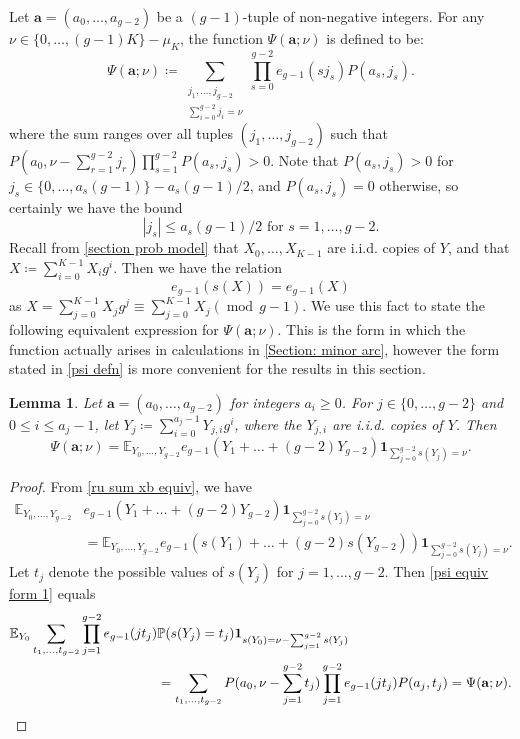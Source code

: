 \documentclass[hidelinks,11pt,reqno]{amsart}
\renewcommand{\leq}{\leqslant}
\renewcommand{\geq}{\geqslant}
\newcommand{\E}{\ensuremath{\mathbb{E}}}
\newcommand{\prob}{\ensuremath{\mathbb{P}}}
\newcommand{\ind}{\mathbf{1}}
\newcommand{\xb}{X}
\newcommand{\ru}[1]{e_{g-1}(#1)}
\newcommand{\sx}[1]{s(#1)}
\newtheorem{lemma}[prop]{Lemma}
\theoremstyle{remark}
\newcommand{\md}[1]{\ensuremath{(\operatorname{mod}\, #1)}}
\begin{document}
Let $\mathbf{a}=(a_{0},\ldots, a_{g-2})$ be a $(g-1)$-tuple of non-negative integers. For any $\nu\in \{0,\ldots, (g-1)K\}-\mu_{K}$, the function $\Psi(\mathbf{a};\nu)$ is defined to be:
\begin{equation}\label{psi defn}
    \Psi(\mathbf{a};\nu)\coloneq \sum_{\substack{j_{1},\ldots, j_{g-2}\\ \sum_{i=0}^{g-2} j_{i}=\nu}}\prod_{s=0}^{g-2}\ru{sj_{s}}P(a_{s},j_{s}).
\end{equation}
where the sum ranges over all tuples $(j_{1},\ldots, j_{g-2})$ such that $P(a_{0},\nu-\sum_{r=1}^{g-2}j_{r})\prod_{s=1}^{g-2}P(a_{s},j_{s})>0$. Note that $P(a_{s},j_{s})>0$ for $j_{s}\in \{0,\ldots, a_{s}(g-1)\}-a_{s}(g-1)/2$, and $P(a_{s},j_{s})=0$ otherwise, so certainly we have the bound
\begin{equation}\label{j range remark}
|j_{s}|\leq a_{s}(g-1)/2 \textrm{ for }s=1,\ldots, g-2.
\end{equation}
Recall from \cref{section prob model} that $X_{0},\ldots, X_{K-1}$ are i.i.d. copies of $Y$, and that $\xb\coloneq \sum_{i=0}^{K-1}X_{i}g^{i}$. Then we have the relation
\begin{equation}\label{ru sum xb equiv}\ru{\sx{\xb}}=\ru{\xb}\end{equation}
 as $\xb=\sum_{j=0}^{K-1}X_{j}g^{j}\equiv \sum_{j=0}^{K-1}X_{j}\md{g-1}$. We use this fact to state the following equivalent expression for $\Psi(\mathbf{a};\nu)$. This is the form in which the function actually arises in calculations in \cref{Section: minor arc}, however the form stated in \cref{psi defn} is more convenient for the results in this section.
\begin{lemma}\label{Psi expectation form} Let $\mathbf{a}=(a_{0},\ldots, a_{g-2})$ for integers $a_{i}\geq 0$. For $j\in \{0,\ldots, g-2\}$ and $0\leq i\leq a_{j}-1$, let $Y_{j}\coloneq \sum_{i=0}^{a_{j}-1}Y_{j,i}g^{i}$, where the $Y_{j,i}$ are i.i.d. copies of $Y$. Then
 \[\Psi(\mathbf{a};\nu)=\E_{Y_{0},\ldots, Y_{g-2}}\ru{Y_{1}+\ldots+(g-2)Y_{g-2}}\ind_{ \sum_{j=0}^{g-2}\sx{Y_{j}}=\nu}.   \]
\end{lemma}
\begin{proof}
From \cref{ru sum xb equiv}, we have
    \begin{align}\label{psi equiv form 1}
        \E_{Y_{0},\ldots, Y_{g-2}}&\ru{Y_{1}+\ldots+(g-2)Y_{g-2}}\ind_{ \sum_{j=0}^{g-2}\sx{Y_{j}}=\nu}\nonumber\\&= \E_{Y_{0},\ldots, Y_{g-2}}\ru{\sx{Y_{1}}+\ldots+(g-2)\sx{Y_{g-2}}}\ind_{ \sum_{j=0}^{g-2}\sx{Y_{j}}=\nu}. 
    \end{align}
    Let $t_{j}$ denote the possible values of $\sx{Y_{j}}$ for $j=1,\ldots, g-2$. Then \cref{psi equiv form 1} equals
    \begin{align*}
        \E_{Y_{0}}\sum_{t_{1},\ldots,t_{g-2}}\prod_{j=1}^{g-2}\ru{jt_{j}}&\prob(\sx{Y_{j}}=t_{j})\ind_{\sx{Y_{0}}=\nu-\sum_{j=1}^{g-2}\sx{Y_{j}}}\\
        &=\sum_{t_{1},\ldots,t_{g-2}}P(a_{0},\nu-\sum_{j=1}^{g-2} t_{j})\prod_{j=1}^{g-2}\ru{jt_{j}}P(a_{j},t_{j})=\Psi(\mathbf{a};\nu).\qedhere
    \end{align*}
\end{proof}
\end{document}
